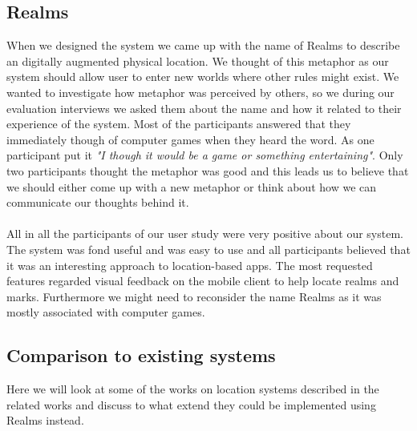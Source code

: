\subsection{Realms} %
\label{sub:realms}
When we designed the system we came up with the name of Realms to describe an digitally augmented physical location. We thought of this metaphor as our system should allow user to enter new worlds where other rules might exist. We wanted to investigate how metaphor was perceived by others, so we during our evaluation interviews we asked them about the name and how it related to their experience of the system.
Most of the participants answered that they immediately though of computer games when they heard the word. As one participant put it \emph{"I though it would be a game or something entertaining"}. Only two participants thought the metaphor was good and this leads us to believe that we should either come up with a new metaphor or think about how we can communicate our thoughts behind it. 
\\\\
All in all the participants of our user study were very positive about our system. The system was fond useful and was easy to use and all participants believed that it was an interesting approach to location-based apps. The most requested features regarded visual feedback on the mobile client to help locate realms and marks. Furthermore we might need to reconsider the name Realms as it was mostly associated with computer games. 

\subsection{Comparison to existing systems} %
\label{sub:comparison_to_existing_systems}
Here we will look at some of the works on location systems described in the related works and discuss to what extend they could be implemented using Realms instead.
